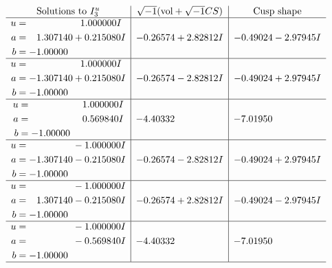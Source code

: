 \documentclass[1p]{elsarticle_modified}
\theoremstyle{definition}
\newcommand{\I}{\sqrt{-1}}
\begin{document}
$$\begin{array}{c|c|c}  
\text{Solutions to }I^u_{3}& \I (\text{vol} + \sqrt{-1}CS) & \text{Cusp shape}\\
 \hline 
\begin{aligned}
u &= \phantom{-0.000000 -}1.000000 I \\
a &= \phantom{-}1.307140 + 0.215080 I \\
b &= -1.00000\phantom{ +0.000000I}\end{aligned}
 & -0.26574 + 2.82812 I & -0.49024 - 2.97945 I \\ \hline\begin{aligned}
u &= \phantom{-0.000000 -}1.000000 I \\
a &= -1.307140 + 0.215080 I \\
b &= -1.00000\phantom{ +0.000000I}\end{aligned}
 & -0.26574 - 2.82812 I & -0.49024 + 2.97945 I \\ \hline\begin{aligned}
u &= \phantom{-0.000000 -}1.000000 I \\
a &= \phantom{-0.000000 -}0.569840 I \\
b &= -1.00000\phantom{ +0.000000I}\end{aligned}
 & -4.40332\phantom{ +0.000000I} & -7.01950\phantom{ +0.000000I} \\ \hline\begin{aligned}
u &= \phantom{-0.000000 } -1.000000 I \\
a &= -1.307140 - 0.215080 I \\
b &= -1.00000\phantom{ +0.000000I}\end{aligned}
 & -0.26574 - 2.82812 I & -0.49024 + 2.97945 I \\ \hline\begin{aligned}
u &= \phantom{-0.000000 } -1.000000 I \\
a &= \phantom{-}1.307140 - 0.215080 I \\
b &= -1.00000\phantom{ +0.000000I}\end{aligned}
 & -0.26574 + 2.82812 I & -0.49024 - 2.97945 I \\ \hline\begin{aligned}
u &= \phantom{-0.000000 } -1.000000 I \\
a &= \phantom{-0.000000 } -0.569840 I \\
b &= -1.00000\phantom{ +0.000000I}\end{aligned}
 & -4.40332\phantom{ +0.000000I} & -7.01950\phantom{ +0.000000I}\\
 \hline 
 \end{array}$$\newpage
\end{document}
